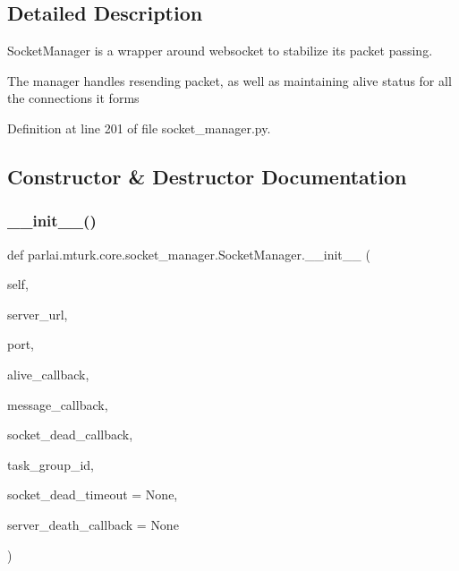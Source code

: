 \subsection{Detailed Description}
\begin{DoxyVerb}SocketManager is a wrapper around websocket to stabilize its packet passing.

The manager handles resending packet, as well as maintaining alive status for all
the connections it forms
\end{DoxyVerb}
 

Definition at line 201 of file socket\+\_\+manager.\+py.



\subsection{Constructor \& Destructor Documentation}
\mbox{\label{classparlai_1_1mturk_1_1core_1_1socket__manager_1_1SocketManager_ad366f39cbef4d0d8307cf350cd088ff9}} 
\subsubsection{\texorpdfstring{\+\_\+\+\_\+init\+\_\+\+\_\+()}{\_\_init\_\_()}}
{\footnotesize\ttfamily def parlai.\+mturk.\+core.\+socket\+\_\+manager.\+Socket\+Manager.\+\_\+\+\_\+init\+\_\+\+\_\+ (\begin{DoxyParamCaption}\item[{}]{self,  }\item[{}]{server\+\_\+url,  }\item[{}]{port,  }\item[{}]{alive\+\_\+callback,  }\item[{}]{message\+\_\+callback,  }\item[{}]{socket\+\_\+dead\+\_\+callback,  }\item[{}]{task\+\_\+group\+\_\+id,  }\item[{}]{socket\+\_\+dead\+\_\+timeout = {\ttfamily None},  }\item[{}]{server\+\_\+death\+\_\+callback = {\ttfamily None} }\end{DoxyParamCaption})}

